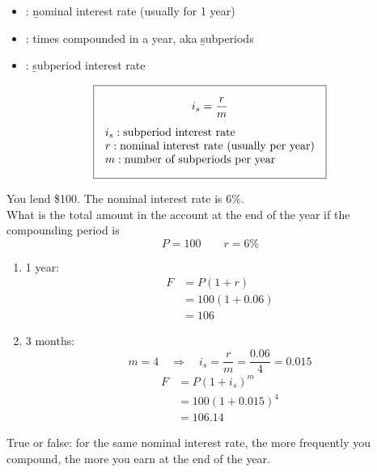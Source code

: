 \begin{itemize}
    \item {}: \b{nominal interest rate} (usually for 1 year)
    \item {}: times compounded in a year, aka \b{subperiods}
    \item {}: \b{subperiod interest rate}
\end{itemize}
\[\boxed{\begin{gathered}
    i_s = \frac{r}{m}\\[4pt]
    \begin{array}{@{}l@{}}
        i_s: \text{subperiod interest rate}\\
        r: \text{nominal interest rate (usually per year)}\\
        m: \text{number of subperiods per year}
    \end{array}
\end{gathered}}\]

\begin{example}
    You lend \$100. The nominal interest rate is 6\%.
    \\What is the total amount in the account at the end of the year if the compounding period is
    \[P = 100 \qquad r = 6\%\]
    \begin{enumerate}[label = \alph*)]
        \item 1 year:
        \begin{align*}
            F &= P(1+r)\\
            &=100(1+0.06)\\
            &=106
        \end{align*}
        \item 3 months:
        \[m = 4 \quad \Rightarrow \quad i_s = \frac{r}{m} = \frac{0.06}{4} = 0.015\]
        \begin{align*}
            F &= P(1+i_s)^m\\
            &=100(1+0.015)^4\\
            &=106.14
        \end{align*}
    \end{enumerate}
\end{example}

\begin{example}[Reflection]
    True or false: for the same nominal interest rate, the more frequently you compound, the more you earn at the end of the year.
    \\
\end{example}

